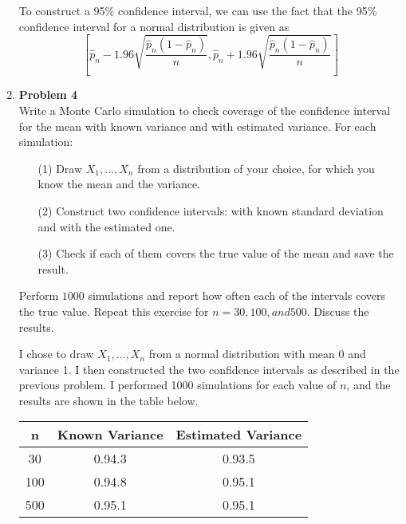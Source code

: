 \documentclass{article}
\newcommand{\gap}{\vspace{1 em}}
\begin{document}
\begin{enumerate}
\begin{solution}
{            To construct a 95\% confidence interval, we can use the fact that the 95\% confidence interval for a normal distribution is given as
            \[
            \left[\hat{p}_n - 1.96 \sqrt{\frac{\hat{p}_n(1-\hat{p}_n)}{n}}, \hat{p}_n + 1.96 \sqrt{\frac{\hat{p}_n(1-\hat{p}_n)}{n}}\right]
            \]
            \gap
        }  
    \end{solution}

    \item \textbf{Problem 4} \\
    Write a Monte Carlo simulation to check coverage of the confidence interval for the mean with known variance and with estimated variance. For each simulation:

    \begin{enumerate}
        \item [(1)]  Draw $X_1, \dots, X_n$ from a distribution of your choice, for which you know the mean and the variance.
        \item [(2)] Construct two confidence intervals: with known standard deviation and with the estimated one.
        \item [(3)] Check if each of them covers the true value of the mean and save the result.
    \end{enumerate}
    Perform $1000$ simulations and report how often each of the intervals covers the true
    value. Repeat this exercise for $n = 30, 100, and 500$. Discuss the results.

    \begin{solution}
        {
            I chose to draw $X_1, \dots, X_n$ from a normal distribution with mean 0 and variance 1. I then constructed the two confidence intervals as described in the previous problem. I performed 1000 simulations for each value of $n$, and the results are shown in the table below.
            \begin{center}
                \begin{tabular}{c|c|c}
                    
                    n & Known Variance & Estimated Variance \\
                    \hline
                    30 & 0.94.3 & 0.93.5 \\
                    
                    100 & 0.94.8 & 0.95.1 \\
                    
                    500 & 0.95.1 & 0.95.1 \\
                    

\end{tabular}
\end{center}}
\end{solution}
\end{enumerate}
\end{document}
